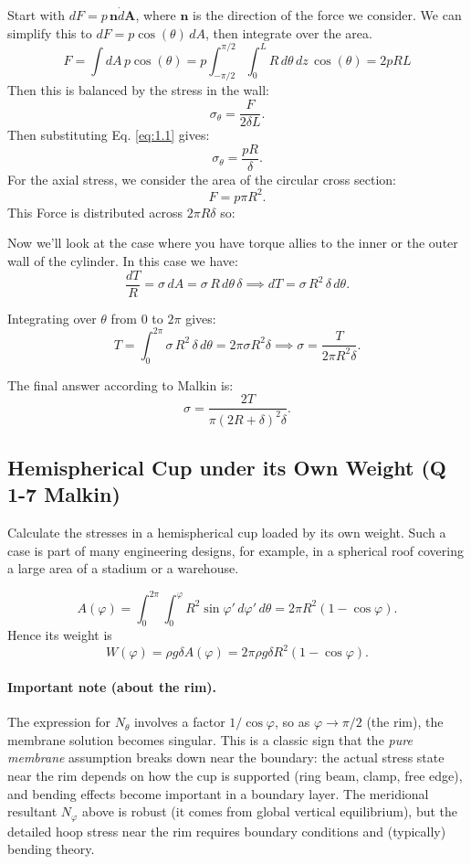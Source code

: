 Start with $dF = p \, \mathbf{n} \dot d\mathbf{A}$, where $\mathbf{n}$ is the direction of the force we consider.
We can simplify this to $dF = p \cos(\theta) \, dA$, then integrate over the area.
\begin{equation}
	F = \int dA \, p \cos(\theta)  
	= p \int_{-\pi/2}^{\pi/2} \int_0^L R \, d\theta \, dz \, \cos(\theta)
	= 2 p R L
	\label{eq:1.1}
\end{equation}
Then this is balanced by the stress in the wall:
\[
	\sigma_\theta = \frac{F}{2 \delta L}.
\]
Then substituting Eq. \ref{eq:1.1} gives:
\[
	\sigma_\theta = \frac{p R}{\delta}.
\]
For the axial stress, we consider the area of the circular cross section:
\[
	F = p \pi R^2.
\]
This Force is distributed across $2 \pi R \delta$ so:


Now we'll look at the case where you have torque allies to the inner or the outer wall of the cylinder.
In this case we have:
\[
	\frac{dT}{R}
	= \sigma \, dA = \sigma \, R \, d\theta \, \delta
	\implies
	dT = \sigma \, R^2 \, \delta \, d\theta.
\]

Integrating over $\theta$ from $0$ to $2\pi$ gives:
\[
	T = \int_0^{2\pi} \sigma \, R^2 \, \delta \, d\theta
	= 2 \pi \sigma R^2 \delta
	\implies
	\sigma = \frac{T}{2 \pi R^2 \delta}.
\]

The final answer according to Malkin is:
\[
	\sigma = \frac{2T}{\pi (2 R + \delta)^2 \delta}.
\]

\subsection{Hemispherical Cup under its Own Weight (Q 1-7 Malkin)}
Calculate the stresses in a hemispherical cup loaded by its own weight. Such a case is part of many engineering designs, for example, in a spherical roof covering a large area of a stadium or a warehouse.

\[
A(\varphi)=\int_{0}^{2\pi}\int_{0}^{\varphi} R^2\sin\varphi'\,d\varphi'\,d\theta
=2\pi R^2(1-\cos\varphi).
\]
Hence its weight is
\[
W(\varphi)=\rho g \delta A(\varphi)=2\pi \rho g \delta R^2(1-\cos\varphi).
\]

\paragraph{Important note (about the rim).}
The expression for $N_\theta$ involves a factor $1/\cos\varphi$, so as $\varphi\to \pi/2$
(the rim), the membrane solution becomes singular.
This is a classic sign that the \emph{pure membrane} assumption breaks down near the boundary:
the actual stress state near the rim depends on how the cup is supported (ring beam, clamp, free edge),
and bending effects become important in a boundary layer.
The meridional resultant $N_\varphi$ above is robust (it comes from global vertical equilibrium),
but the detailed hoop stress near the rim requires boundary conditions and (typically) bending theory.

